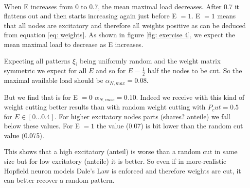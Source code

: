 \paragraph*{}
When E increases from 0 to 0.7, the mean maximal load decreases. After 0.7 it flattens out and then starts increasing again just before E $= 1$. E $=1$ means that all nodes are excitatory and therefore all weights positive as can be deduced from equation \ref{eq: weights}. As shown in figure \ref{fig: exercise 4}, we expect the mean maximal load to decrease as E increases. 

Expecting all patterns $\xi_i$ being uniformly random and the weight matrix symmetric we expect for all $E$ and so for $E = \frac{1}{2}$ half the nodes to be cut.
So the maximal available load should be $\alpha_{N,max} = 0.08$. 

But we find that is for E $= 0$ $\alpha_{N,max} = 0.10 $. Indeed we receive with this kind of weight cutting better results than with random weight cutting with $P_cut=0.5$  for $E \in [0 \ldots 0.4] $. For higher excitatory nodes parts (shares? anteile) we fall below these values. For E $ = 1$ the value (0.07) is bit lower than the random cut  value (0.075).

This shows that a high excitatory (anteil) is worse than a random cut in same size but for low excitatory (anteile) it is better. So even if in more-realistic Hopfield neuron models Dale's Law is enforced and therefore weights are cut, it can better recover a random pattern.


	